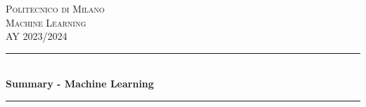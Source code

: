 \documentclass[12pt]{article}
\begin{document}
\begin{titlepage}

    \newcommand{\HRule}{\rule{\linewidth}{0.5mm}} %



    \center %


    \textsc{\LARGE Politecnico di Milano}\\[1.5cm] %
    \textsc{\Large Machine Learning}\\[0.5cm] %
    \textsc{\large AY 2023/2024}\\[0.5cm] %


    \HRule \\[0.4cm]
    { \huge \bfseries Summary - Machine Learning}\\[0.4cm] %
    \HRule \\[1.5cm]





\end{titlepage}
\end{document}
